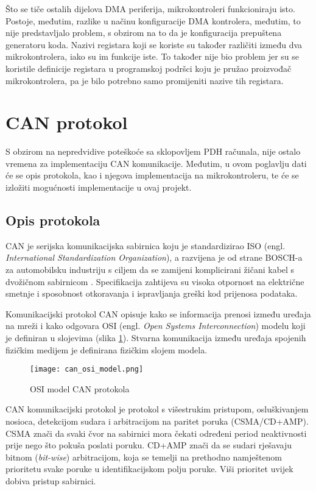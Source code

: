 Što se tiče ostalih dijelova DMA periferija, mikrokontroleri funkcioniraju isto. Postoje, međutim, razlike u načinu konfiguracije DMA kontrolera, međutim, to nije predstavljalo problem, s obzirom na to da je konfiguracija prepuštena generatoru koda. Nazivi registara koji se koriste su također različiti između dva mikrokontrolera, iako su im funkcije iste. To također nije bio problem jer su se koristile definicije registara u programskoj podršci koju je pružao proizvođač mikrokontrolera, pa je bilo potrebno samo promijeniti nazive tih registara.

\section{CAN protokol}

S obzirom na nepredvidive poteškoće sa sklopovljem PDH računala, nije ostalo vremena za implementaciju CAN komunikacije. Međutim, u ovom poglavlju dati će se opis protokola, kao i njegova implementacija na mikrokontroleru, te će se izložiti mogućnosti implementacije u ovaj projekt.

\subsection{Opis protokola}

CAN je serijska komunikacijska sabirnica koju je standardizirao ISO (engl. \textit{International Standardization Organization}), a razvijena je od strane BOSCH-a za automobilsku industriju s ciljem da se zamijeni komplicirani žičani kabel s dvožičnom sabirnicom \cite{can_manual}. Specifikacija zahtijeva su visoka otpornost na električne smetnje i sposobnost otkoravanja i ispravljanja greški kod prijenosa podataka.

Komunikacijski protokol CAN opisuje kako se informacija prenosi između uređaja na mreži i kako odgovara OSI (engl. \textit{Open Systems Interconnection}) modelu koji je definiran u slojevima (slika \ref{fig:can_osi_model}). Stvarna komunikacija između uređaja spojenih fizičkim medijem je definirana fizičkim slojem modela.

\begin{figure}[H]
	\centering
	\texttt{[image: can\_osi\_model.png]}
	\caption{OSI model CAN protokola \cite[str. 2]{can_manual}}
	\label{fig:can_osi_model}
\end{figure}

CAN komunikacijski protokol je protokol s višestrukim pristupom, osluškivanjem nosioca, detekcijom sudara i arbitracijom na paritet poruka (CSMA/CD+AMP). CSMA znači da svaki čvor na sabirnici mora čekati određeni period neaktivnosti prije nego što pokuša poslati poruku. CD+AMP znači da se sudari rješavaju bitnom (\textit{bit-wise}) arbitracijom, koja se temelji na prethodno namještenom prioritetu svake poruke u identifikacijskom polju poruke. Viši prioritet uvijek dobiva pristup sabirnici.

